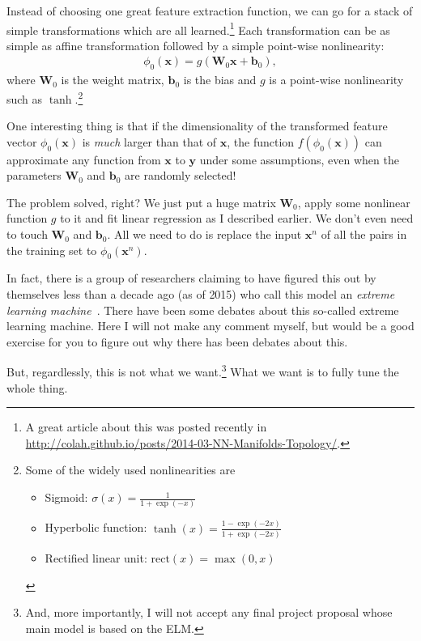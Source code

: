 \documentclass{report}
\newcommand{\vect}[1]{\mathbf{#1}}
\newcommand{\matr}[1]{\mathbf{#1}}
\newcommand{\vb}[0]{\vect{b}}
\newcommand{\vx}[0]{\vect{x}}
\newcommand{\vy}[0]{\vect{y}}
\newcommand{\mW}[0]{\matr{W}}
\newcommand{\rect}{\text{rect}}
\begin{document}
Instead of choosing one great feature extraction function, we can go for a stack
of simple transformations which are all learned.\footnote{
    A great article about this was posted recently in
    \url{http://colah.github.io/posts/2014-03-NN-Manifolds-Topology/}.
}
Each transformation can be as simple as affine transformation followed by a
simple point-wise nonlinearity:
\begin{align}
    \label{eq:layer}
    \phi_0(\vx) = g(\mW_0 \vx + \vb_0),
\end{align}
where $\mW_0$ is the weight matrix, $\vb_0$ is the bias and $g$ is a point-wise
nonlinearity such as $\tanh$.\footnote{
    Some of the widely used nonlinearities are
    \begin{itemize}
        \item Sigmoid: $\sigma(x) = \frac{1}{1+\exp(-x)}$
        \item Hyperbolic function: $\tanh(x) = \frac{1-\exp(-2x)}{1+\exp(-2x)}$
        \item Rectified linear unit: $\rect(x) = \max(0, x)$
    \end{itemize}
}

One interesting thing is that if the dimensionality of the transformed feature
vector $\phi_0(\vx)$ is {\em much} larger than that of $\vx$, the function
$f(\phi_0(\vx))$ can approximate any function from $\vx$ to $\vy$ under some
assumptions, even when the parameters $\mW_0$ and $\vb_0$ are randomly
selected!~\cite{Cover1965} 

The problem solved, right? We just put a huge matrix $\mW_0$, apply some
nonlinear function $g$ to it and fit linear regression as I described earlier.
We don't even need to touch $\mW_0$ and $\vb_0$. All we need to do is replace
the input $\vx^n$ of all the pairs in the training set to $\phi_0(\vx^n)$.

In fact, there is a group of researchers claiming to have figured this out by
themselves less than a decade ago (as of 2015) who call this model an {\em
extreme learning machine}~\cite{Huang2006}. There have been some debates about
this so-called extreme learning machine. Here I will not make any comment
myself, but would be a good exercise for you to figure out why there has been
debates about this.

But, regardlessly, this is not what we want.\footnote{
    And, more importantly, I will not accept any final project proposal whose
    main model is based on the ELM.
}
What we want is to fully tune the whole thing.
\end{document}
